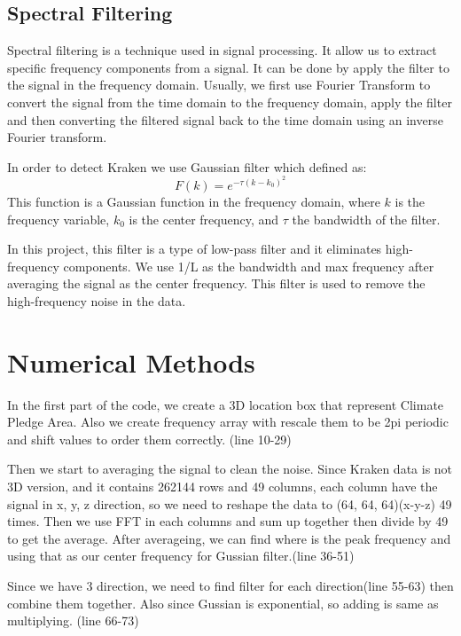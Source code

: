 \documentclass[12pt]{article}%
\begin{document}
\subsection{Spectral Filtering}

Spectral filtering is a technique used in signal processing. It allow us to extract specific frequency components from a signal. It can be done by apply the filter to the signal in the frequency domain. Usually, we first use Fourier Transform to convert the signal from the time domain to the frequency domain, apply the filter and then converting the filtered signal back to the time domain using an inverse Fourier transform.

In order to detect Kraken we use Gaussian filter which defined as:
\begin{equation}
    F(k) = e^{-\tau(k - k_0)^2}
\end{equation}
This function is a Gaussian function in the frequency domain, where $k$ is the frequency variable, $k_0$ is the center frequency, and $\tau$ the bandwidth of the filter. 

In this project, this filter is a type of low-pass filter and it eliminates high-frequency components. We use 1/L as the bandwidth and max frequency after averaging the signal as the center frequency. This filter is used to remove the high-frequency noise in the data.

\section{Numerical Methods}

In the first part of the code, we create a 3D location box that represent Climate Pledge Area. Also we create frequency array with rescale them to be 2pi periodic and shift values to order them correctly. (line 10-29)

Then we start to averaging the signal to clean the noise. Since Kraken data is not 3D version, and it contains 262144 rows and 49 columns, each column have the signal in x, y, z direction, so we need to reshape the data to (64, 64, 64)(x-y-z) 49 times. Then we use FFT in each columns and sum up together then divide by 49 to get the average. After averageing, we can find where is the peak frequency and using that as our center frequency for Gussian filter.(line 36-51)

Since we have 3 direction, we need to find filter for each direction(line 55-63) then combine them together. Also since Gussian is exponential, so adding is same as multiplying. (line 66-73)
\end{document}
